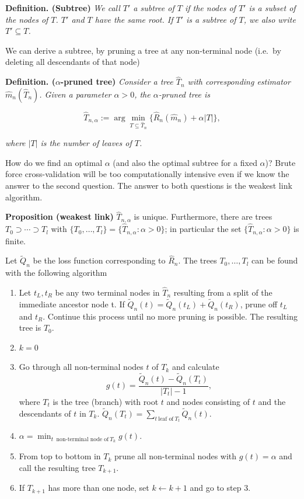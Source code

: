 \documentclass[
]{book}
\begin{document}
\textbf{Definition. (Subtree)} \emph{We call \(T'\) a subtree of \(T\) if the nodes of \(T'\) is a subset of the nodes of \(T\). \(T'\) and \(T\) have the same root. If \(T'\) is a subtree of \(T\), we also write \(T'\subseteq T\).}

We can derive a subtree, by pruning a tree at any non-terminal node (i.e.~by deleting all descendants of that node)

\textbf{Definition. (\(\alpha\)-pruned tree)} \emph{Consider a tree \(\hat T_n\) with corresponding estimator \(\hat m_n(\hat T_n)\). Given a parameter \(\alpha>0\), the \(\alpha\)-pruned tree is}

\[
\hat T_{n,\alpha} := \arg \min_{T\subseteq \hat T_n}\{\hat R_n(\hat m_n) + \alpha |T|\},
\]

\emph{where \(|T|\) is the number of leaves of \(T\).}

How do we find an optimal \(\alpha\) (and also the optimal subtree for a fixed \(\alpha\))? Brute force cross-validation will be too computationally intensive even if we know the answer to the second question. The answer to both questions is the weakest link algorithm.

\textbf{Proposition (weakest link)} \(\hat T_{n,\alpha}\) is unique. Furthermore, there are trees \(T_0\supset \cdots\supset T_l\) with \(\{T_0,\dots, T_l\}=\{\hat T_{n,\alpha} : \alpha>0\}\); in particular the set \(\{\hat T_{n,\alpha} : \alpha>0\}\) is finite.

Let \(\widetilde Q_n\) be the loss function corresponding to \(\hat R_n\).
The trees \(T_0,\dots, T_l\) can be found with the following algorithm

\begin{enumerate}
\def\labelenumi{\arabic{enumi})}
\item
  Let \(t_L,t_R\) be any two terminal nodes in \(\hat T_n\) resulting from a split of the immediate ancestor node t. If \(\widetilde Q_n(t) = \widetilde Q_n(t_L)+\widetilde Q_n(t_R)\), prune off \(t_L\) and \(t_R\). Continue this process until no more pruning is possible. The resulting tree is \(T_0\).
\item
  \(k=0\)
\item
  Go through all non-terminal nodes \(t\) of \(T_k\) and calculate
  \[
  g(t)=\frac{\widetilde Q_n(t)-\widetilde Q_n(T_t)}{|T_t|-1},
  \]
  where \(T_t\) is the tree (branch) with root \(t\) and nodes consisting of \(t\) and the descendants of \(t\) in \(T_k\).
  \(\widetilde Q_n(T_t)=\sum_{t \ \text{leaf of}\  T_t} \widetilde Q_n(t)\).
\item
  \(\alpha= \min_{t \ \text{ non-terminal node of} \ T_k}g(t)\).
\item
  From top to bottom in \(T_k\) prune all non-terminal nodes with \(g(t)=\alpha\) and call the resulting tree \(T_{k+1}\).
\item
  If \(T_{k+1}\) has more than one node, set \(k \leftarrow k+1\) and go to step 3.
\end{enumerate}
\end{document}
